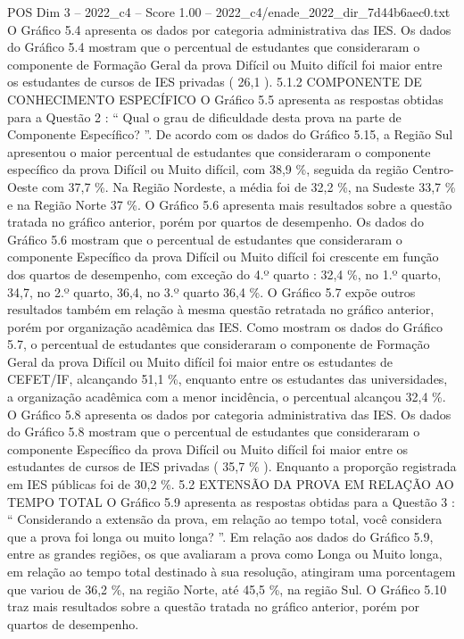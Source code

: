 \begin{textsample}{POS Dim 3 – 2022\_c4 – Score 1.00 – 2022\_c4/enade\_2022\_dir\_7d44b6aec0.txt}
O Gráfico 5.4 apresenta os dados por categoria administrativa das IES.
Os dados do Gráfico 5.4 mostram que o percentual de estudantes que consideraram o componente de Formação Geral da prova Difícil ou Muito difícil foi maior entre os estudantes de cursos de IES privadas ( 26,1 ). 5.1.2 COMPONENTE DE CONHECIMENTO ESPECÍFICO O Gráfico 5.5 apresenta as respostas obtidas para a Questão 2 : “ Qual o grau de dificuldade desta prova na parte de Componente Específico? ”.
De acordo com os dados do Gráfico 5.15, a Região Sul apresentou o maior percentual de estudantes que consideraram o componente específico da prova Difícil ou Muito difícil, com 38,9 \%, seguida da região Centro-Oeste com 37,7 \%.
Na Região Nordeste, a média foi de 32,2 \%, na Sudeste 33,7 \% e na Região Norte 37 \%.
O Gráfico 5.6 apresenta mais resultados sobre a questão tratada no gráfico anterior, porém por quartos de desempenho.
Os dados do Gráfico 5.6 mostram que o percentual de estudantes que consideraram o componente Específico da prova Difícil ou Muito difícil foi crescente em função dos quartos de desempenho, com exceção do 4.º quarto : 32,4 \%, no 1.º quarto, 34,7, no 2.º quarto, 36,4, no 3.º quarto 36,4 \%.
O Gráfico 5.7 expõe outros resultados também em relação à mesma questão retratada no gráfico anterior, porém por organização acadêmica das IES.
Como mostram os dados do Gráfico 5.7, o percentual de estudantes que consideraram o componente de Formação Geral da prova Difícil ou Muito difícil foi maior entre os estudantes de CEFET/IF, alcançando 51,1 \%, enquanto entre os estudantes das universidades, a organização acadêmica com a menor incidência, o percentual alcançou 32,4 \%.
O Gráfico 5.8 apresenta os dados por categoria administrativa das IES.
Os dados do Gráfico 5.8 mostram que o percentual de estudantes que consideraram o componente Específico da prova Difícil ou Muito difícil foi maior entre os estudantes de cursos de IES privadas ( 35,7 \% ).
Enquanto a proporção registrada em IES públicas foi de 30,2 \%. 5.2 EXTENSÃO DA PROVA EM RELAÇÃO AO TEMPO TOTAL O Gráfico 5.9 apresenta as respostas obtidas para a Questão 3 : “ Considerando a extensão da prova, em relação ao tempo total, você considera que a prova foi longa ou muito longa? ”.
Em relação aos dados do Gráfico 5.9, entre as grandes regiões, os que avaliaram a prova como Longa ou Muito longa, em relação ao tempo total destinado à sua resolução, atingiram uma porcentagem que variou de 36,2 \%, na região Norte, até 45,5 \%, na região Sul.
O Gráfico 5.10 traz mais resultados sobre a questão tratada no gráfico anterior, porém por quartos de desempenho.

\end{textsample}
